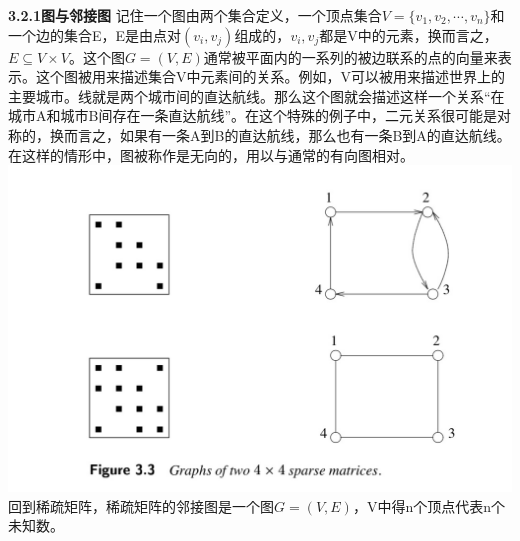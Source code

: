 \documentclass{article}
\begin{document}
\textbf{3.2.1图与邻接图}
记住一个图由两个集合定义，一个顶点集合$V =\{v_1,v_2,\cdots,v_n\}$和一个边的集合E，E是由点对$(v_i,v_j)$组成的，$v_i,v_j$都是V中的元素，换而言之，$E\subseteq V\times V$。这个图$G=(V,E)$通常被平面内的一系列的被边联系的点的向量来表示。这个图被用来描述集合V中元素间的关系。例如，V可以被用来描述世界上的主要城市。线就是两个城市间的直达航线。那么这个图就会描述这样一个关系“在城市A和城市B间存在一条直达航线”。在这个特殊的例子中，二元关系很可能是对称的，换而言之，如果有一条A到B的直达航线，那么也有一条B到A的直达航线。在这样的情形中，图被称作是无向的，用以与通常的有向图相对。
  \newline\newline\newline\newline\newline\newline
\includegraphics[scale=0.25]{3_3.png}
\newline\newline
回到稀疏矩阵，稀疏矩阵的邻接图是一个图$G=(V,E)$，V中得n个顶点代表n个未知数。
\end{document}
